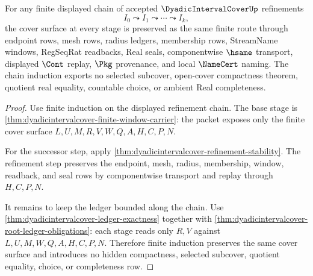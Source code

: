 \begin{theorem}
\label{thm:dyadicintervalcover-refinement-chain-induction}
For any finite displayed chain of accepted $\DyadicIntervalCoverUp$ refinements
$$
I_0 \leadsto I_1 \leadsto \cdots \leadsto I_k,
$$
the cover surface at every stage is preserved as the same finite route through endpoint rows, mesh rows, radius ledgers, membership rows, StreamName windows, RegSeqRat readbacks, Real seals, componentwise $\hsame$ transport, displayed $\Cont$ replay, $\Pkg$ provenance, and local $\NameCert$ naming. The chain induction exports no selected subcover, open-cover compactness theorem, quotient real equality, countable choice, or ambient Real completeness.
\end{theorem}
\begin{proof}
Use finite induction on the displayed refinement chain. The base stage is \autoref{thm:dyadicintervalcover-finite-window-carrier}: the packet exposes only the finite cover surface $L,U,M,R,V,W,Q,A,H,C,P,N$.

For the successor step, apply \autoref{thm:dyadicintervalcover-refinement-stability}. The refinement step preserves the endpoint, mesh, radius, membership, window, readback, and seal rows by componentwise transport and replay through $H,C,P,N$.

It remains to keep the ledger bounded along the chain. Use \autoref{thm:dyadicintervalcover-ledger-exactness} together with \autoref{thm:dyadicintervalcover-root-ledger-obligations}: each stage reads only $R,V$ against $L,U,M,W,Q,A,H,C,P,N$. Therefore finite induction preserves the same cover surface and introduces no hidden compactness, selected subcover, quotient equality, choice, or completeness row.
\end{proof}

